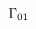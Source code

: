 \documentclass[10pt]{amsart}
\theoremstyle{break}
\begin{document}
\begin{figure}[hbt]
\begin{equation*}
{\unitlength 0.1in
\begin{picture}(6.05,9.00)(2.00,-10.00)
\special{pn 8}\special{pa 400 800}\special{pa 405 832}\special{pa 422 861}\special{pa 449 885}\special{pa 482 898}\special{pa 517 898}\special{pa 550 885}\special{pa 577 862}\special{pa 595 833}\special{pa 600 801}\special{pa 600 289}\special{pa 591 258}\special{pa 569 230}\special{pa 540 210}\special{pa 506 200}\special{pa 472 205}\special{pa 440 222}\special{pa 416 247}\special{pa 402 278}\special{pa 400 300}\special{sp}\special{pn 8}\special{pa 400 600}\special{pa 400 500}\special{fp}\special{pn 8}\special{pa 200 600}\special{pa 200 500}\special{fp}\special{pn 8}\special{pa 200 800}\special{pa 200 832}\special{pa 200 864}\special{pa 200 896}\special{pa 207 928}\special{pa 225 958}\special{pa 251 982}\special{pa 282 997}\special{pa 315 1000}\special{pa 699 1000}\special{pa 731 992}\special{pa 760 973}\special{pa 784 946}\special{pa 798 915}\special{pa 800 883}\special{pa 800 211}\special{pa 796 179}\special{pa 780 148}\special{pa 755 122}\special{pa 724 105}\special{pa 692 100}\special{pa 308 100}\special{pa 276 105}\special{pa 246 122}\special{pa 221 148}\special{pa 204 178}\special{pa 200 210}\special{pa 200 242}\special{pa 200 274}\special{pa 200 300}\special{sp}\special{sh 1}\special{pa 600 420}\special{pa 620 353}\special{pa 600 367}\special{pa 580 353}\special{pa 600 420}\special{fp}\special{sh 1}\special{pa 800 420}\special{pa 820 353}\special{pa 800 367}\special{pa 780 353}\special{pa 800 420}\special{fp}\special{pn 8}\special{pa 400 800}\special{pa 397 768}\special{pa 387 737}\special{pa 380 706}\special{pa 384 675}\special{pa 393 644}\special{pa 400 612}\special{pa 400 600}\special{sp}\special{pn 8}\special{pa 200 800}\special{pa 203 768}\special{pa 213 737}\special{pa 220 706}\special{pa 216 675}\special{pa 207 644}\special{pa 200 612}\special{pa 200 600}\special{sp}\special{pn 8}\special{pa 400 300}\special{pa 393 326}\special{pa 365 338}\special{pa 325 341}\special{pa 300 340}\special{sp}\special{pn 8}\special{pa 200 300}\special{pa 207 326}\special{pa 235 338}\special{pa 275 341}\special{pa 300 340}\special{sp}\special{pn 8}\special{pa 400 500}\special{pa 393 474}\special{pa 365 462}\special{pa 325 459}\special{pa 300 460}\special{sp}\special{pn 8}\special{pa 200 500}\special{pa 207 474}\special{pa 235 462}\special{pa 275 459}\special{pa 300 460}\special{sp}\special{pn 8}\special{pa 290 460}\special{pa 290 340}\special{fp}\special{pn 8}\special{pa 310 460}\special{pa 310 340}\special{fp}\put(5.00,-11.0000){\makebox(0,0){$\Gamma_{01}$}}\end{picture}
}
\end{equation*}
\end{figure}
\end{document}
